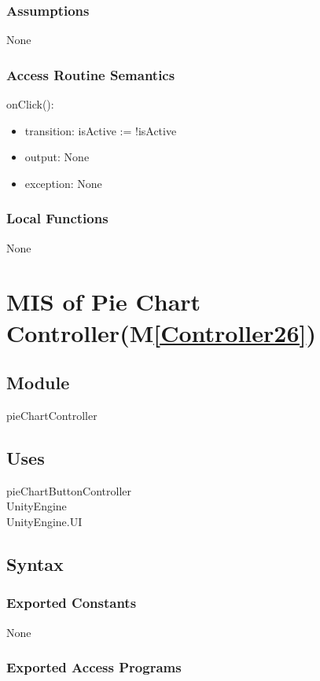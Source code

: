 \documentclass[12pt, titlepage]{article}
\newcommand{\mref}[1]{M\ref{#1}}
\begin{document}
\subsubsection{Assumptions}
None
\subsubsection{Access Routine Semantics}

\noindent onClick():
\begin{itemize}
\item transition: isActive := !isActive
\item output: None
\item exception: None
\end{itemize}


\subsubsection{Local Functions}
None

\newpage

\section{MIS of Pie Chart Controller(\mref{Controller26})}  

\subsection{Module}

pieChartController

\subsection{Uses}
pieChartButtonController\\
UnityEngine\\
UnityEngine.UI
\subsection{Syntax}
\subsubsection{Exported Constants}
None
\subsubsection{Exported Access Programs}
\end{document}
